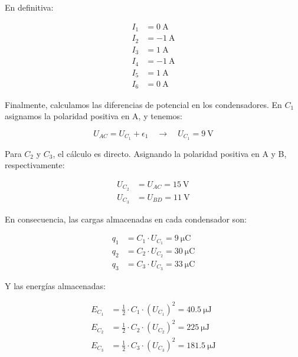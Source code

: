\vspace{-3mm}
En definitiva:

\vspace{-3mm}
\begin{align*}
  I_1 &= \qty{0}{\ampere}\\
  I_2 &= \qty{-1}{\ampere}\\
  I_3 &= \qty{1}{\ampere}\\
  I_4 &= \qty{-1}{\ampere}\\
  I_5 &= \qty{1}{\ampere}\\
  I_6 &= \qty{0}{\ampere}
\end{align*}

Finalmente, calculamos las diferencias de potencial en los
condensadores. En $C_1$ asignamos la polaridad positiva en A, y
tenemos:

\vspace{-2mm}
\begin{equation*}
  U_{AC} = U_{C_1} + \epsilon_1 \quad \rightarrow \quad U_{C_1} = \qty{9}{\volt}
\end{equation*}

\vspace{2mm}
Para $C_2$ y $C_3$, el cálculo es directo. Asignando la polaridad positiva en A y B, respectivamente:

\vspace{-4mm}
\begin{align*}
  U_{C_2} &=  U_{AC} = \qty{15}{\volt}\\
  U_{C_3} &=  U_{BD} = \qty{11}{\volt}
\end{align*}

\vspace{2mm}
En consecuencia, las cargas almacenadas en cada condensador son:

\vspace{-4mm}
\begin{align*}
  q_1 &= C_1 \cdot U_{C_1} = \qty{9}{\micro\coulomb}\\
  q_2 &= C_2 \cdot U_{C_2} = \qty{30}{\micro\coulomb}\\
  q_3 &= C_3 \cdot U_{C_3} = \qty{33}{\micro\coulomb}
\end{align*}

Y las energías almacenadas:

\vspace{-4mm}
\begin{align*}
  E_{C_1} &= \frac{1}{2} \cdot C_1 \cdot (U_{C_1})^2 = \qty{40.5}{\micro\joule}\\
  E_{C_2} &= \frac{1}{2} \cdot C_2 \cdot (U_{C_2})^2 = \qty{225}{\micro\joule}\\
  E_{C_3} &= \frac{1}{2} \cdot C_3 \cdot (U_{C_3})^2 = \qty{181.5}{\micro\joule}
\end{align*}

